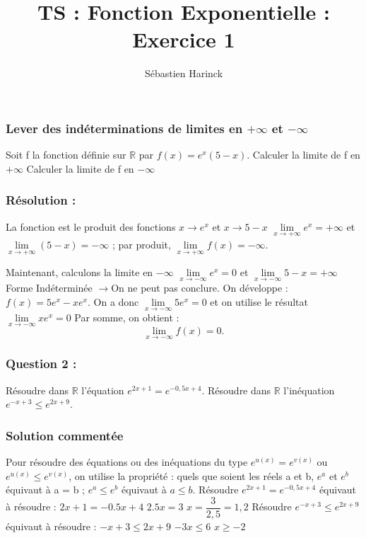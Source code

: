 \documentclass[t]{beamer}
\title{TS : Fonction Exponentielle : Exercice 1}
\author{Sébastien Harinck}
\institute{www.cours-futes.com}
\date{}
\begin{document}
\begin{frame}
\titlepage
\end{frame}

\begin{frame}
\frametitle{Lever des indéterminations de limites en $ + \infty $ et $ - \infty $}
\pause
Soit f la fonction définie sur $\mathbb{R}$ par $f(x) = e^x(5 - x)$.
\pause
Calculer la limite de f en $ + \infty $
\pause
Calculer la limite de f en $ - \infty $
\pause
\end{frame}

\begin{frame}
\frametitle{Résolution :}
\pause
La fonction est le produit des fonctions $x \rightarrow e^x$ et $x \rightarrow 5 - x$
\pause
\( \lim\limits_{x \rightarrow + \infty} e^x = + \infty\)
et
\( \lim\limits_{x \rightarrow + \infty} (5 -x) = - \infty\)
; par produit,
\( \lim\limits_{x \rightarrow + \infty} f(x) = - \infty	\).

Maintenant, calculons la limite en $ - \infty $
\pause
\( \lim\limits_{x \rightarrow - \infty} e^x = 0\)
et
\( \lim\limits_{x \rightarrow - \infty} 5 - x = + \infty \)
\pause
Forme Indéterminée $ \rightarrow $On ne peut pas conclure.
\pause
On développe : $ f(x) = 5e^x - xe^x$.
\pause
On a donc 
\( \lim\limits_{x \rightarrow - \infty} 5e^x = 0\)
et on utilise le résultat
\( \lim\limits_{x \rightarrow - \infty} xe^x = 0\)
\pause
Par somme, on obtient :
\pause
\[ \lim\limits_{x \rightarrow - \infty} f(x) = 0.\]
\end{frame}

\begin{frame}
\frametitle{Question 2 :}
\pause
Résoudre dans $ \mathbb{R}$ l'équation $e^{2x+1} = e^{-0,5x+4}$.
\pause
Résoudre dans $ \mathbb{R}$ l'inéquation $e^{-x+3} \leq e^{2x+9}$.
\pause
\end{frame}

\begin{frame}
\frametitle{Solution commentée}
\pause
Pour résoudre des équations ou des inéquations du type $ e^{u(x)} = e^{v(x)}$ ou $ e^{u(x)} \leq e^{v(x)} $,
on utilise la propriété : quels que soient les réels a et b, $e^a$ et $e^b$ équivaut à a = b ; $e^a \leq e^b$ équivaut à $a \leq b$.
\pause
Résoudre $e^{2x+1} = e^{-0,5x+4}$ équivaut à résoudre : $2x+1 = -0.5x+4$
\pause
\( 2.5x = 3\)
\pause
\( x = \dfrac{3}{2,5} = 1,2\)
\pause
Résoudre $e^{-x+3} \leq e^{2x+9}$ équivaut à résoudre : $-x+3 \leq 2x+9$
\pause
\( -3x \leq 6\)
\pause
\( x \geq -2\)
\pause
\end{frame}
\end{document}
